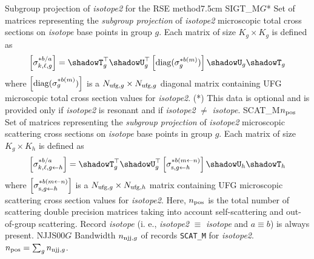 \begin{DescriptionEnregistrement}{Subgroup projection of {\sl isotope2} for the RSE method}{7.5cm}\label{table:spmrse}
\OptDirlEnr
  {SIGT\_M}{$G$}{*}
  {Set of matrices representing the {\sl subgroup projection} of {\sl isotope2} microscopic total cross sections on {\sl isotope} base
  points in group $g$. Each matrix of size $K_g \times K_g$ is defined as
  $$\left[\sigma^{*b/a}_{k,\ell,g}\right]=\shadowT_g^\top \shadowU_g^\top \left[{\rm diag}(\sigma^{*b(m)}_g)\right] \shadowU_g \shadowT_g$$
  \noindent where $\left[{\rm diag}(\sigma^{*b(m)}_g)\right]$ is a $N_{{\rm ufg},g} \times N_{{\rm ufg},g}$ diagonal matrix containing UFG microscopic total cross section values for {\sl isotope2}.
  (*) This data is optional and is provided only if {\sl isotope2} is resonant and if {\sl isotope2} $\neq$ {\sl isotope}.}
\DirlEnr
  {SCAT\_M}{$n_{\rm pos}$}
  {Set of matrices representing the {\sl subgroup projection} of {\sl isotope2} microscopic scattering cross sections on {\sl isotope} base
  points in group $g$. Each matrix of size $K_g \times K_h$ is defined as
  $$\left[\sigma^{*b/a}_{k,\ell,g\leftarrow h}\right]=\shadowT_g^\top \shadowU_g^\top \left[\sigma^{*b(m\leftarrow n)}_{{\rm s},g \leftarrow h}\right] \shadowU_h \shadowT_h$$
  \noindent where $\left[\sigma^{*b(m\leftarrow n)}_{{\rm s},g \leftarrow h}\right]$ is a $N_{{\rm ufg},g} \times N_{{\rm ufg},h}$ matrix containing UFG microscopic scattering cross section values for {\sl isotope2}. Here, $n_{\rm pos}$ is the total number of scattering double precision matrices taking into account self-scattering and out-of-group scattering. Record {\sl isotope} (i. e., {\sl isotope2} $\equiv$ {\sl isotope} and $a\equiv b$) is always present.}
\IntEnr
  {NJJS00}{$G$}
  {Bandwidth $n_{{\rm njj},g}$ of records {\tt SCAT\_M} for {\sl isotope2}. $n_{\rm pos}=\sum_g n_{{\rm njj},g}$.}
\end{DescriptionEnregistrement}
\eject
